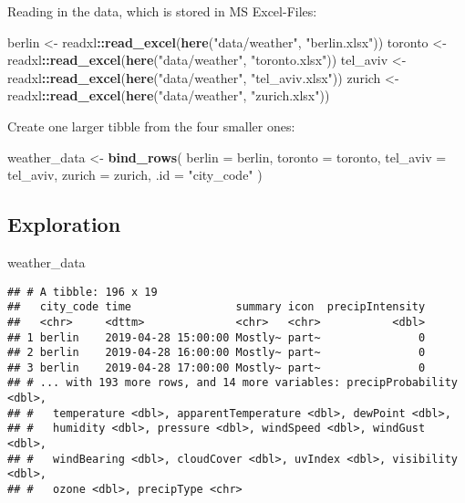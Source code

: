 \documentclass[]{book}
\newenvironment{Shaded}{\begin{snugshade}}{\end{snugshade}}
\newcommand{\DataTypeTok}[1]{\textcolor[rgb]{0.13,0.29,0.53}{#1}}
\newcommand{\KeywordTok}[1]{\textcolor[rgb]{0.13,0.29,0.53}{\textbf{#1}}}
\newcommand{\NormalTok}[1]{#1}
\newcommand{\OperatorTok}[1]{\textcolor[rgb]{0.81,0.36,0.00}{\textbf{#1}}}
\newcommand{\StringTok}[1]{\textcolor[rgb]{0.31,0.60,0.02}{#1}}
\begin{document}
Reading in the data, which is stored in MS Excel-Files:

\begin{Shaded}
\begin{Highlighting}[]
\NormalTok{berlin <-}\StringTok{ }\NormalTok{readxl}\OperatorTok{::}\KeywordTok{read_excel}\NormalTok{(}\KeywordTok{here}\NormalTok{(}\StringTok{"data/weather"}\NormalTok{, }\StringTok{"berlin.xlsx"}\NormalTok{))}
\NormalTok{toronto <-}\StringTok{ }\NormalTok{readxl}\OperatorTok{::}\KeywordTok{read_excel}\NormalTok{(}\KeywordTok{here}\NormalTok{(}\StringTok{"data/weather"}\NormalTok{, }\StringTok{"toronto.xlsx"}\NormalTok{))}
\NormalTok{tel_aviv <-}\StringTok{ }\NormalTok{readxl}\OperatorTok{::}\KeywordTok{read_excel}\NormalTok{(}\KeywordTok{here}\NormalTok{(}\StringTok{"data/weather"}\NormalTok{, }\StringTok{"tel_aviv.xlsx"}\NormalTok{))}
\NormalTok{zurich <-}\StringTok{ }\NormalTok{readxl}\OperatorTok{::}\KeywordTok{read_excel}\NormalTok{(}\KeywordTok{here}\NormalTok{(}\StringTok{"data/weather"}\NormalTok{, }\StringTok{"zurich.xlsx"}\NormalTok{))}
\end{Highlighting}
\end{Shaded}

Create one larger tibble from the four smaller ones:

\begin{Shaded}
\begin{Highlighting}[]
\NormalTok{weather_data <-}\StringTok{ }\KeywordTok{bind_rows}\NormalTok{(}
  \DataTypeTok{berlin =}\NormalTok{ berlin,}
  \DataTypeTok{toronto =}\NormalTok{ toronto,}
  \DataTypeTok{tel_aviv =}\NormalTok{ tel_aviv,}
  \DataTypeTok{zurich =}\NormalTok{ zurich,}
  \DataTypeTok{.id =} \StringTok{"city_code"}
\NormalTok{)}
\end{Highlighting}
\end{Shaded}

\hypertarget{exploration}{%
\subsection{Exploration}\label{exploration}}

\begin{Shaded}
\begin{Highlighting}[]
\NormalTok{weather_data}
\end{Highlighting}
\end{Shaded}

\begin{verbatim}
## # A tibble: 196 x 19
##   city_code time                summary icon  precipIntensity
##   <chr>     <dttm>              <chr>   <chr>           <dbl>
## 1 berlin    2019-04-28 15:00:00 Mostly~ part~               0
## 2 berlin    2019-04-28 16:00:00 Mostly~ part~               0
## 3 berlin    2019-04-28 17:00:00 Mostly~ part~               0
## # ... with 193 more rows, and 14 more variables: precipProbability <dbl>,
## #   temperature <dbl>, apparentTemperature <dbl>, dewPoint <dbl>,
## #   humidity <dbl>, pressure <dbl>, windSpeed <dbl>, windGust <dbl>,
## #   windBearing <dbl>, cloudCover <dbl>, uvIndex <dbl>, visibility <dbl>,
## #   ozone <dbl>, precipType <chr>
\end{verbatim}
\end{document}
